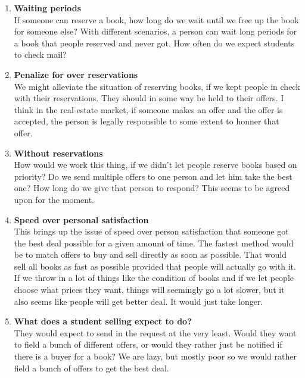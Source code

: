 \begin{enumerate}
\item  {\bf Waiting periods}\\

If someone can reserve a book, how long do we wait until we free up
the book for someone else?  With different scenarios, a person can
wait long periods for a book that people reserved and never got.
How often do we expect students to check mail?


\item {\bf  Penalize for over reservations}\\

We might alleviate the situation of reserving books, if we kept people
in check with their reservations.  They should in some way be held to
their offers.  I think in the real-estate market, if someone makes an
offer and the offer is accepted, the person is legally responsible to
some extent to honner that offer.


\item  {\bf Without reservations}\\

How would we work this thing, if we didn't let people reserve books
based on priority?  Do we send multiple offers to one person and let
him take the best one?  How long do we give that person to respond?
This seems to be agreed upon for the moment.


\item {\bf Speed over personal satisfaction}\\

This brings up the issue of speed over person satisfaction that
someone got the best deal possible for a given amount of time.  The
fastest method would be to match offers to buy and sell directly as
soon as possible.  That would sell all books as fast as possible
provided that people will actually go with it.  If we throw in a lot
of things like the condition of books and if we let people choose what
prices they want, things will seemingly go a lot slower, but it also
seems like people will get better deal.  It would just take longer.


\item  {\bf What does a student selling expect to do?}\\

They would expect to send in the request at the very least.  Would
they want to field a bunch of different offers, or would they rather
just be notified if there is a buyer for a book?
We are lazy, but mostly poor so we would rather field a bunch of
offers to get the best deal.



\end{enumerate}
